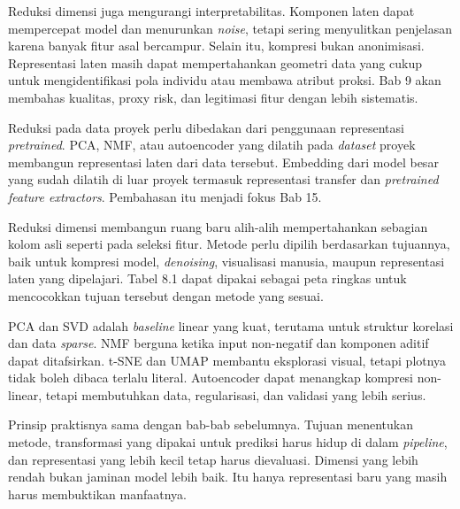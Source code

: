 Reduksi dimensi juga mengurangi interpretabilitas. Komponen laten dapat mempercepat model dan menurunkan \emph{noise}, tetapi sering menyulitkan penjelasan karena banyak fitur asal bercampur. Selain itu, kompresi bukan anonimisasi. Representasi laten masih dapat mempertahankan geometri data yang cukup untuk mengidentifikasi pola individu atau membawa atribut proksi. Bab 9 akan membahas kualitas, proxy risk, dan legitimasi fitur dengan lebih sistematis.

Reduksi pada data proyek perlu dibedakan dari penggunaan representasi \emph{pretrained}. PCA, NMF, atau autoencoder yang dilatih pada \emph{dataset} proyek membangun representasi laten dari data tersebut. Embedding dari model besar yang sudah dilatih di luar proyek termasuk representasi transfer dan \emph{pretrained feature extractors}. Pembahasan itu menjadi fokus Bab 15.

\begin{sintesis}

Reduksi dimensi membangun ruang baru alih-alih mempertahankan sebagian kolom asli seperti pada seleksi fitur. Metode perlu dipilih berdasarkan tujuannya, baik untuk kompresi model, \emph{denoising}, visualisasi manusia, maupun representasi laten yang dipelajari. Tabel 8.1 dapat dipakai sebagai peta ringkas untuk mencocokkan tujuan tersebut dengan metode yang sesuai.

PCA dan SVD adalah \emph{baseline} linear yang kuat, terutama untuk struktur korelasi dan data \emph{sparse}. NMF berguna ketika input non-negatif dan komponen aditif dapat ditafsirkan. t-SNE dan UMAP membantu eksplorasi visual, tetapi plotnya tidak boleh dibaca terlalu literal. Autoencoder dapat menangkap kompresi non-linear, tetapi membutuhkan data, regularisasi, dan validasi yang lebih serius.

Prinsip praktisnya sama dengan bab-bab sebelumnya. Tujuan menentukan metode, transformasi yang dipakai untuk prediksi harus hidup di dalam \emph{pipeline}, dan representasi yang lebih kecil tetap harus dievaluasi. Dimensi yang lebih rendah bukan jaminan model lebih baik. Itu hanya representasi baru yang masih harus membuktikan manfaatnya.

\end{sintesis}


